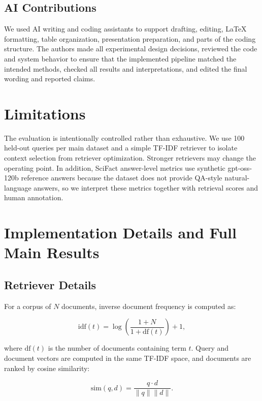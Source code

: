\documentclass[11pt]{article}
\begin{document}
\subsection*{AI Contributions}
We used AI writing and coding assistants to support drafting, editing, LaTeX formatting, table organization, presentation preparation, and parts of the coding structure. The authors made all experimental design decisions, reviewed the code and system behavior to ensure that the implemented pipeline matched the intended methods, checked all results and interpretations, and edited the final wording and reported claims.

\section*{Limitations}
The evaluation is intentionally controlled rather than exhaustive. We use 100 held-out queries per main dataset and a simple TF-IDF retriever to isolate context selection from retriever optimization. Stronger retrievers may change the operating point. In addition, SciFact answer-level metrics use synthetic gpt-oss-120b reference answers because the dataset does not provide QA-style natural-language answers, so we interpret these metrics together with retrieval scores and human annotation.


\clearpage
\onecolumn
\section{Implementation Details and Full Main Results}

\subsection{Retriever Details}
\label{app:retriever-details}

For a corpus of $N$ documents, inverse document frequency is computed as:

\begin{equation}
\mathrm{idf}(t) = \log\left(\frac{1 + N}{1 + \mathrm{df}(t)}\right) + 1,
\end{equation}

where $\mathrm{df}(t)$ is the number of documents containing term $t$. Query and document vectors are computed in the same TF-IDF space, and documents are ranked by cosine similarity:

\begin{equation}
\mathrm{sim}(q,d) = \frac{q \cdot d}{\lVert q \rVert \lVert d \rVert}.
\end{equation}
\end{document}
